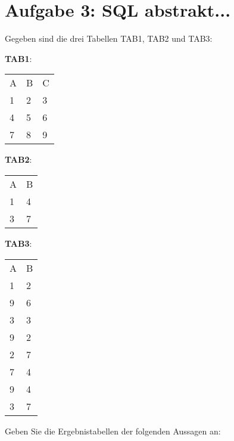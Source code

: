 \documentclass{lehramt-informatik}
\newcommand{\tmptabelle}[1]{
\bigskip
\par
\noindent
\textbf{#1}:
\bigskip
\par
\noindent
}
\begin{document}
%

\section{Aufgabe 3: SQL abstrakt...}

Gegeben sind die drei Tabellen TAB1, TAB2 und TAB3:

\tmptabelle{TAB1}

\begin{tabular}{lll}
A&B&C\\
1&2&3\\
4&5&6\\
7&8&9\\
\end{tabular}

\tmptabelle{TAB2}

\begin{tabular}{ll}
A&B\\
1&4\\
3&7\\
\end{tabular}

\tmptabelle{TAB3}

\begin{tabular}{ll}
A&B\\
1&2\\
9&6\\
3&3\\
9&2\\
2&7\\
7&4\\
9&4\\
3&7\\
\end{tabular}

\bigskip

Geben Sie die Ergebnistabellen der folgenden Aussagen an:
\end{document}
